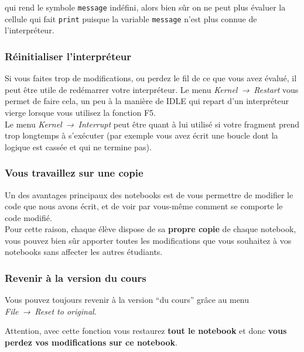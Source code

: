     qui rend le symbole \texttt{message} indéfini, alors bien sûr on ne peut
plus évaluer la cellule qui fait \texttt{print} puisque la variable
\texttt{message} n'est plus connue de l'interpréteur.

    \hypertarget{ruxe9initialiser-linterpruxe9teur}{%
\subsubsection{Réinitialiser
l'interpréteur}\label{ruxe9initialiser-linterpruxe9teur}}

    Si vous faites trop de modifications, ou perdez le fil de ce que vous
avez évalué, il peut être utile de redémarrer votre interpréteur. Le
menu \emph{Kernel~→~Restart} vous permet de faire cela, un peu à la
manière de IDLE qui repart d'un interpréteur vierge lorsque vous
utilisez la fonction F5.\\

    Le menu \emph{Kernel~→~Interrupt} peut être quant à lui utilisé si votre
fragment prend trop longtemps à s'exécuter (par exemple vous avez écrit
une boucle dont la logique est cassée et qui ne termine pas).

    \hypertarget{vous-travaillez-sur-une-copie}{%
\subsubsection{Vous travaillez sur une
copie}\label{vous-travaillez-sur-une-copie}}

    Un des avantages principaux des notebooks est de vous permettre de
modifier le code que nous avons écrit, et de voir par vous-même comment
se comporte le code modifié.\\

Pour cette raison, chaque élève dispose de sa \textbf{propre copie} de
chaque notebook, vous pouvez bien sûr apporter toutes les modifications
que vous souhaitez à vos notebooks sans affecter les autres étudiants.

    \hypertarget{revenir-uxe0-la-version-du-cours}{%
\subsubsection{Revenir à la version du
cours}\label{revenir-uxe0-la-version-du-cours}}

    Vous pouvez toujours revenir à la version ``du cours'' grâce au menu
\emph{File~→~Reset to original}.

    Attention, avec cette fonction vous restaurez \textbf{tout le notebook}
et donc \textbf{vous perdez vos modifications sur ce notebook}.

